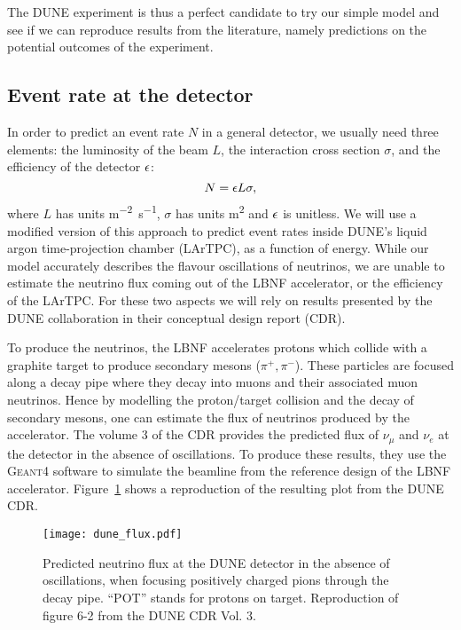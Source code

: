 The DUNE experiment is thus a perfect candidate to try our simple model and see if
we can reproduce results from the literature, namely predictions on the
potential outcomes of the experiment.

\subsection{Event rate at the detector}
In order to predict an event rate $N$ in a general detector, we usually need three
elements: the luminosity of the beam $L$, the interaction cross section $\sigma$, and the
efficiency of the detector $\epsilon$:
\begin{equation}N = \epsilon L \sigma,\label{eq:rate}\end{equation}
where $L$ has units \si{\m^{-2} \s^{-1}}, $\sigma$ has units \si{\m^2} and
$\epsilon$ is unitless.
We will use a modified version of this approach to predict event rates inside
DUNE's liquid argon time-projection chamber (LArTPC), as a function of
energy. While our model
accurately describes the flavour oscillations of neutrinos, we are unable to
estimate the neutrino flux coming out of the LBNF accelerator, or the
efficiency of the LArTPC. For these two aspects we will rely on results
presented by the DUNE collaboration in their conceptual design report (CDR).

To produce the neutrinos, the LBNF accelerates protons which collide with a
graphite target to produce secondary mesons ($\pi^+, \pi^-$). These particles are focused
along a decay pipe where they decay into muons and their associated muon
neutrinos\cite{papadimitriou}. Hence by modelling the proton/target collision and the
decay of secondary mesons, one can estimate the flux of neutrinos produced by
the accelerator. The volume 3 of the CDR\cite{cdr_vol3} provides the predicted
flux of $\nu_\mu$ and $\nu_e$ at the detector in the absence of oscillations.
To produce these results, they use the \textsc{Geant4}\cite{Geant4} software to simulate
the beamline from the reference design of the LBNF accelerator.
Figure~\ref{fig:nuflux} shows a reproduction of the resulting plot from the DUNE CDR.
\begin{figure}
	\centering
	\texttt{[image: dune\_flux.pdf]}
	\caption{Predicted neutrino flux at the DUNE detector in the absence of
	oscillations, when focusing positively charged pions through the decay pipe. 
	``POT'' stands for protons on target.
	Reproduction of figure 6-2 from the DUNE CDR Vol.
	3\cite{cdr_vol3}.}
	\label{fig:nuflux}
\end{figure}

